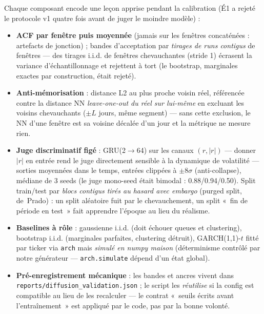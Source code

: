 \documentclass[11pt,a4paper]{article}
\newcommand{\code}[1]{\texttt{#1}}
\begin{document}
Chaque composant encode une leçon apprise pendant la calibration (É1 a rejeté
le protocole v1 quatre fois avant de juger le moindre modèle) :

\begin{itemize}[itemsep=2pt]
  \item \textbf{ACF par fenêtre puis moyennée} (jamais sur les fenêtres
        concaténées : artefacts de jonction) ; bandes d'acceptation par
        \emph{tirages de runs contigus} de fenêtres --- des tirages i.i.d. de
        fenêtres chevauchantes (stride 1) écrasent la variance
        d'échantillonnage et rejettent à tort (le bootstrap, marginales
        exactes par construction, était rejeté).
  \item \textbf{Anti-mémorisation} : distance L2 au plus proche voisin réel,
        référencée contre la distance NN \emph{leave-one-out du réel sur
        lui-même} en excluant les voisins chevauchants ($\pm L$ jours, même
        segment) --- sans cette exclusion, le NN d'une fenêtre est sa voisine
        décalée d'un jour et la métrique ne mesure rien.
  \item \textbf{Juge discriminatif figé} : GRU(2$\to$64) sur les canaux
        $(r, |r|)$ --- donner $|r|$ en entrée rend le juge directement
        sensible à la dynamique de volatilité --- sorties moyennées dans le
        temps, entrées clippées à $\pm 8\sigma$ (anti-collapse), médiane de 3
        seeds (le juge mono-seed était bimodal : 0.88/0.94/0.50). Split
        train/test par \emph{blocs contigus tirés au hasard avec embargo}
        (purged split, de~Prado) : un split aléatoire fuit par le
        chevauchement, un split «~fin de période en test~» fait apprendre
        l'époque au lieu du réalisme.
  \item \textbf{Baselines à rôle} : gaussienne i.i.d. (doit échouer queues et
        clustering), bootstrap i.i.d. (marginales parfaites, clustering
        détruit), GARCH(1,1)-$t$ fitté par ticker via \code{arch} mais
        \emph{simulé en numpy maison} (déterminisme contrôlé par notre
        générateur --- \code{arch.simulate} dépend d'un état global).
  \item \textbf{Pré-enregistrement mécanique} : les bandes et ancres vivent
        dans \code{reports/diffusion\_validation.json} ; le script les
        \emph{réutilise} si la config est compatible au lieu de les recalculer
        --- le contrat «~seuils écrits avant l'entraînement~» est appliqué par
        le code, pas par la bonne volonté.
\end{itemize}
\end{document}

